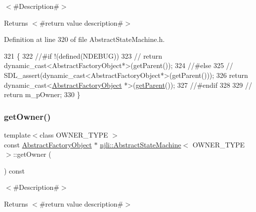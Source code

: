 $<$\#\+Description\#$>$

\begin{DoxyReturn}{Returns}
$<$\#return value description\#$>$ 
\end{DoxyReturn}


Definition at line 320 of file Abstract\+State\+Machine.\+h.


\begin{DoxyCode}
321   \{
322     \textcolor{comment}{//#if !(defined(NDEBUG))}
323     \textcolor{comment}{//    return dynamic\_cast<AbstractFactoryObject*>(getParent());}
324     \textcolor{comment}{//#else}
325     \textcolor{comment}{//    SDL\_assert(dynamic\_cast<AbstractFactoryObject*>(getParent()));}
326     \textcolor{keywordflow}{return} \textcolor{keyword}{dynamic\_cast<}\mbox{\hyperlink{classnjli_1_1_abstract_factory_object_a4f7ae7bf09c7c9426e7d6023f7fd8dec}{AbstractFactoryObject}} *\textcolor{keyword}{>}(\mbox{\hyperlink{classnjli_1_1_abstract_decorator_a02e7976cdd7bcc8852e2e6b6dcc5b7ac}{getParent}}());
327     \textcolor{comment}{//#endif}
328 
329     \textcolor{comment}{//        return m\_pOwner;}
330   \}
\end{DoxyCode}
\mbox{\label{classnjli_1_1_abstract_state_machine_ade6a658a2ad9ef8c83b900e8b866ae7c}} 
\subsubsection{\texorpdfstring{get\+Owner()}{getOwner()}\hspace{0.1cm}{\footnotesize\ttfamily [2/2]}}
{\footnotesize\ttfamily template$<$class O\+W\+N\+E\+R\+\_\+\+T\+Y\+PE $>$ \\
const \mbox{\hyperlink{classnjli_1_1_abstract_factory_object}{Abstract\+Factory\+Object}} $\ast$ \mbox{\hyperlink{classnjli_1_1_abstract_state_machine}{njli\+::\+Abstract\+State\+Machine}}$<$ O\+W\+N\+E\+R\+\_\+\+T\+Y\+PE $>$\+::get\+Owner (\begin{DoxyParamCaption}{ }\end{DoxyParamCaption}) const\hspace{0.3cm}{\ttfamily [virtual]}}

$<$\#\+Description\#$>$

\begin{DoxyReturn}{Returns}
$<$\#return value description\#$>$ 
\end{DoxyReturn}


